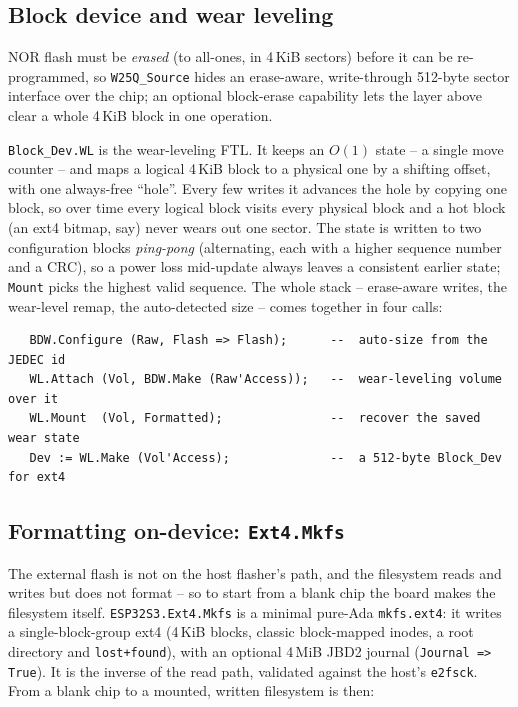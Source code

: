 \subsection{Block device and wear leveling}

NOR flash must be \emph{erased} (to all-ones, in 4\,KiB sectors) before it can be
re-programmed, so \texttt{W25Q\_Source} hides an erase-aware, write-through
512-byte sector interface over the chip; an optional block-erase capability lets
the layer above clear a whole 4\,KiB block in one operation.

\texttt{Block\_Dev.WL} is the wear-leveling FTL. It keeps an $O(1)$ state -- a
single move counter -- and maps a logical 4\,KiB block to a physical one by a
shifting offset, with one always-free ``hole''. Every few writes it advances the
hole by copying one block, so over time every logical block visits every physical
block and a hot block (an ext4 bitmap, say) never wears out one sector. The state
is written to two configuration blocks \emph{ping-pong} (alternating, each with a
higher sequence number and a CRC), so a power loss mid-update always leaves a
consistent earlier state; \texttt{Mount} picks the highest valid sequence. The
whole stack -- erase-aware writes, the wear-level remap, the auto-detected size
-- comes together in four calls:

\begin{lstlisting}
   BDW.Configure (Raw, Flash => Flash);      --  auto-size from the JEDEC id
   WL.Attach (Vol, BDW.Make (Raw'Access));   --  wear-leveling volume over it
   WL.Mount  (Vol, Formatted);               --  recover the saved wear state
   Dev := WL.Make (Vol'Access);              --  a 512-byte Block_Dev for ext4
\end{lstlisting}

\subsection{Formatting on-device: \texttt{Ext4.Mkfs}}

The external flash is not on the host flasher's path, and the filesystem reads and
writes but does not format -- so to start from a blank chip the board makes the
filesystem itself. \texttt{ESP32S3.Ext4.Mkfs} is a minimal pure-Ada
\texttt{mkfs.ext4}: it writes a single-block-group ext4 (4\,KiB blocks, classic
block-mapped inodes, a root directory and \texttt{lost+found}), with an optional
4\,MiB JBD2 journal (\texttt{Journal => True}). It is the inverse of the read path,
validated against the host's \texttt{e2fsck}. From a blank chip to a mounted,
written filesystem is then:

